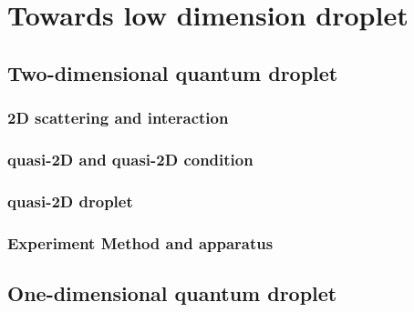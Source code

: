 \chapter{Towards low dimension droplet}
\label{chap_LowD}

\section{Two-dimensional quantum droplet}
\subsection{2D scattering and interaction}
\subsection{quasi-2D and quasi-2D condition}
\subsection{quasi-2D droplet}
\subsection{Experiment Method and apparatus}
\subsection{}


\section{One-dimensional quantum droplet}